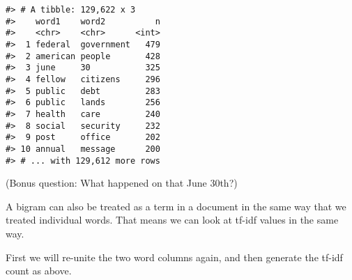 \documentclass[]{book}
\newenvironment{Shaded}{\begin{snugshade}}{\end{snugshade}}
\newcommand{\CommentTok}[1]{\textcolor[rgb]{0.56,0.35,0.01}{\textit{#1}}}
\newcommand{\DataTypeTok}[1]{\textcolor[rgb]{0.13,0.29,0.53}{#1}}
\newcommand{\DecValTok}[1]{\textcolor[rgb]{0.00,0.00,0.81}{#1}}
\newcommand{\KeywordTok}[1]{\textcolor[rgb]{0.13,0.29,0.53}{\textbf{#1}}}
\newcommand{\NormalTok}[1]{#1}
\newcommand{\OperatorTok}[1]{\textcolor[rgb]{0.81,0.36,0.00}{\textbf{#1}}}
\newcommand{\OtherTok}[1]{\textcolor[rgb]{0.56,0.35,0.01}{#1}}
\newcommand{\StringTok}[1]{\textcolor[rgb]{0.31,0.60,0.02}{#1}}
\begin{document}
\begin{Shaded}
\end{Shaded}

\begin{verbatim}
#> # A tibble: 129,622 x 3
#>    word1    word2          n
#>    <chr>    <chr>      <int>
#>  1 federal  government   479
#>  2 american people       428
#>  3 june     30           325
#>  4 fellow   citizens     296
#>  5 public   debt         283
#>  6 public   lands        256
#>  7 health   care         240
#>  8 social   security     232
#>  9 post     office       202
#> 10 annual   message      200
#> # ... with 129,612 more rows
\end{verbatim}

(Bonus question: What happened on that June 30th?)

A bigram can also be treated as a term in a document in the same way that we treated individual words. That means we can look at tf-idf values in the same way.

First we will re-unite the two word columns again, and then generate the tf-idf count as above.

\begin{Shaded}
\end{Shaded}
\end{document}
